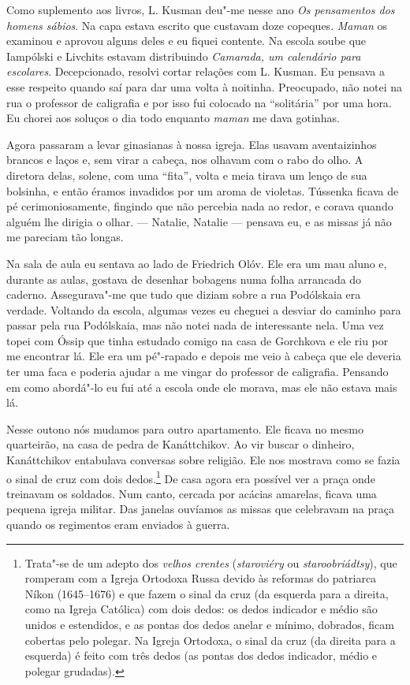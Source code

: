 Como suplemento aos livros, L. Kusman deu"-me nesse ano \emph{Os
pensamentos dos homens sábios}. Na capa estava escrito que custavam doze
copeques. \emph{Maman} os examinou e aprovou alguns deles e eu fiquei
contente. Na escola soube que Iampólski e Livchits estavam distribuindo
\emph{Camarada, um calendário para escolares}. Decepcionado, resolvi
cortar relações com L. Kusman. Eu pensava a esse respeito quando saí
para dar uma volta à noitinha. Preocupado, não notei na rua o professor
de caligrafia e por isso fui colocado na ``solitária'' por uma hora. Eu
chorei aos soluços o dia todo enquanto \emph{maman} me dava gotinhas.

Agora passaram a levar ginasianas à nossa igreja. Elas usavam
aventaizinhos brancos e laços e, sem virar a cabeça, nos olhavam com o
rabo do olho. A diretora delas, solene, com uma ``fita'', volta e meia
tirava um lenço de sua bolsinha, e então éramos invadidos por um aroma
de violetas. Tússenka ficava de pé cerimoniosamente, fingindo que não
percebia nada ao redor, e corava quando alguém lhe dirigia o olhar. ---
Natalie, Natalie --- pensava eu, e as missas já não me pareciam tão
longas.

Na sala de aula eu sentava ao lado de Friedrich Olóv. Ele era um mau
aluno e, durante as aulas, gostava de desenhar bobagens numa folha
arrancada do caderno. Assegurava"-me que tudo que diziam sobre a rua
Podólskaia era verdade. Voltando da escola, algumas vezes eu cheguei a
desviar do caminho para passar pela rua Podólskaia, mas não notei nada
de interessante nela. Uma vez topei com Óssip que tinha estudado comigo
na casa de Gorchkova e ele riu por me encontrar lá. Ele era um pé"-rapado
e depois me veio à cabeça que ele deveria ter uma faca e poderia ajudar
a me vingar do professor de caligrafia. Pensando em como abordá"-lo eu
fui até a escola onde ele morava, mas ele não estava mais lá.

Nesse outono nós mudamos para outro apartamento. Ele ficava no mesmo
quarteirão, na casa de pedra de Kanáttchikov. Ao vir buscar o dinheiro,
Kanáttchikov entabulava conversas sobre religião. Ele nos mostrava como
se fazia o sinal de cruz com dois dedos.\footnote{Trata"-se de um adepto %
  dos \emph{velhos crentes} (\emph{staroviéry} ou
  \emph{staroobriádtsy}), que romperam com a Igreja Ortodoxa Russa
  devido às reformas do patriarca Níkon (1645--1676) e que fazem
  o sinal da cruz (da esquerda para a direita, como na Igreja Católica)
  com dois dedos: os dedos indicador e médio são unidos e estendidos, e
  as pontas dos dedos anelar e mínimo, dobrados, ficam cobertas pelo
  polegar. Na Igreja Ortodoxa, o sinal da cruz (da direita para a
  esquerda) é feito com três dedos (as pontas dos dedos indicador, médio
  e polegar grudadas).} De casa agora era possível ver a praça onde
treinavam os soldados. Num canto, cercada por acácias amarelas, ficava
uma pequena igreja militar. Das janelas ouvíamos as missas que
celebravam na praça quando os regimentos eram enviados à guerra.

